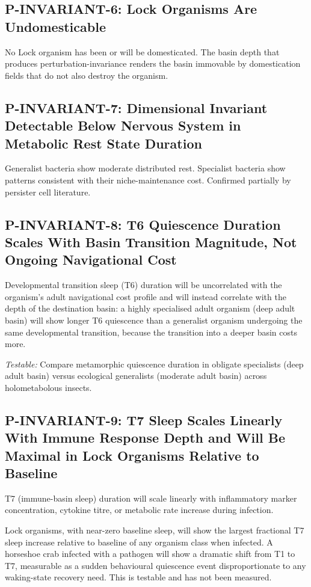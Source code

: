 \documentclass[10pt, a4paper]{article}
\begin{document}
\subsection{P-INVARIANT-6: Lock Organisms
Are Undomesticable}

No Lock organism has been or will be
domesticated. The basin depth that
produces perturbation-invariance renders
the basin immovable by domestication
fields that do not also destroy the
organism.

\subsection{P-INVARIANT-7: Dimensional
Invariant Detectable Below Nervous System
in Metabolic Rest State Duration}

Generalist bacteria show moderate
distributed rest. Specialist bacteria
show patterns consistent with their
niche-maintenance cost. Confirmed
partially by persister cell literature.

\subsection{P-INVARIANT-8: T6 Quiescence
Duration Scales With Basin Transition
Magnitude, Not Ongoing Navigational Cost}

Developmental transition sleep (T6)
duration will be uncorrelated with the
organism's adult navigational cost profile
and will instead correlate with the
depth of the destination basin: a highly
specialised adult organism (deep adult
basin) will show longer T6 quiescence
than a generalist organism undergoing
the same developmental transition,
because the transition into a deeper
basin costs more.

\textit{Testable:} Compare metamorphic
quiescence duration in obligate
specialists (deep adult basin) versus
ecological generalists (moderate adult
basin) across holometabolous insects.

\subsection{P-INVARIANT-9: T7 Sleep
Scales Linearly With Immune Response
Depth and Will Be Maximal in Lock
Organisms Relative to Baseline}

T7 (immune-basin sleep) duration will
scale linearly with inflammatory marker
concentration, cytokine titre, or metabolic
rate increase during infection.

Lock organisms, with near-zero baseline
sleep, will show the largest fractional
T7 sleep increase relative to baseline
of any organism class when infected.
A horseshoe crab infected with a pathogen
will show a dramatic shift from T1 to T7,
measurable as a sudden behavioural
quiescence event disproportionate to any
waking-state recovery need. This is
testable and has not been measured.
\end{document}
